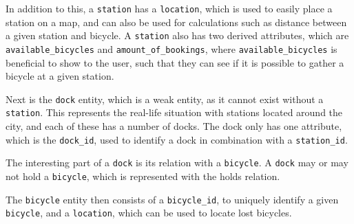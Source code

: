 In addition to this, a \texttt{station} has a \texttt{location}, which is used to easily place a station on a map, and can also be used for calculations such as distance between a given station and bicycle.
A \texttt{station} also has two derived attributes, which are \texttt{available_bicycles} and \texttt{amount_of_bookings}, where \texttt{available_bicycles} is beneficial to show to the user, such that they can see if it is possible to gather a bicycle at a given station.

Next is the \texttt{dock} entity, which is a weak entity, as it cannot exist without a \texttt{station}.
This represents the real-life situation with stations located around the city, and each of these has a number of docks.
The dock only has one attribute, which is the \texttt{dock_id}, used to identify a dock in combination with a \texttt{station_id}.

The interesting part of a \texttt{dock} is its relation with a \texttt{bicycle}.
A \texttt{dock} may or may not hold a \texttt{bicycle}, which is represented with the holds relation.

The \texttt{bicycle} entity then consists of a \texttt{bicycle_id}, to uniquely identify a given \texttt{bicycle}, and a \texttt{location}, which can be used to locate lost bicycles.